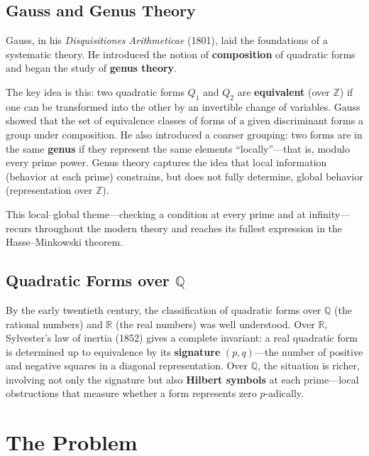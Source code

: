 \subsection{Gauss and Genus Theory}

Gauss, in his \emph{Disquisitiones Arithmeticae} (1801), laid the foundations of a systematic theory. He introduced the notion of \textbf{composition} of quadratic forms and began the study of \textbf{genus theory}.

The key idea is this: two quadratic forms $Q_1$ and $Q_2$ are \textbf{equivalent} (over $\mathbb{Z}$) if one can be transformed into the other by an invertible change of variables. Gauss showed that the set of equivalence classes of forms of a given discriminant forms a group under composition. He also introduced a coarser grouping: two forms are in the same \textbf{genus} if they represent the same elements ``locally''---that is, modulo every prime power. Genus theory captures the idea that local information (behavior at each prime) constrains, but does not fully determine, global behavior (representation over $\mathbb{Z}$).

This local--global theme---checking a condition at every prime and at infinity---recurs throughout the modern theory and reaches its fullest expression in the Hasse--Minkowski theorem.

\subsection{Quadratic Forms over \texorpdfstring{$\mathbb{Q}$}{Q}}

By the early twentieth century, the classification of quadratic forms over $\mathbb{Q}$ (the rational numbers) and $\mathbb{R}$ (the real numbers) was well understood. Over $\mathbb{R}$, Sylvester's law of inertia (1852) gives a complete invariant: a real quadratic form is determined up to equivalence by its \textbf{signature} $(p, q)$---the number of positive and negative squares in a diagonal representation. Over $\mathbb{Q}$, the situation is richer, involving not only the signature but also \textbf{Hilbert symbols} at each prime---local obstructions that measure whether a form represents zero $p$-adically.

\section{The Problem}

